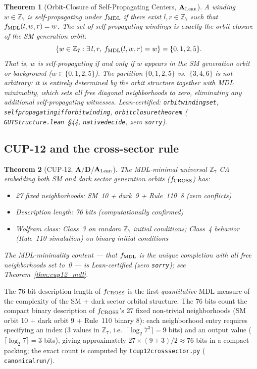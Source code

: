 \documentclass[11pt]{article}
\newtheorem{theorem}{Theorem}[section]
\theoremstyle{remark}
\newcommand{\lean}[1]{%
  \penalty-100
  \begingroup\def\_{\textunderscore\allowbreak}\texttt{#1}\endgroup}
\newcommand{\CatAL}{\ensuremath{\textbf{A}_{\rm Lean}}}
\newcommand{\CatAD}{\textbf{A/D}}
\begin{document}
\begin{theorem}[Orbit-Closure of Self-Propagating Centers, $\CatAL$]
\label{thm:orbit_closure}
A winding $w \in \mathbb{Z}_7$ is \emph{self-propagating} under $f_{\rm MDL}$ if there
exist $l, r \in \mathbb{Z}_7$ such that $f_{\rm MDL}(l, w, r) = w$. The set of
self-propagating windings is exactly the orbit-closure of the SM generation orbit:
\[
  \{w \in \mathbb{Z}_7 : \exists\, l, r,\; f_{\rm MDL}(l, w, r) = w\} = \{0, 1, 2, 5\}.
\]
That is, $w$ is self-propagating if and only if $w$ appears in the SM generation orbit
or background ($w \in \{0, 1, 2, 5\}$). The partition $\{0,1,2,5\}$
vs.\ $\{3,4,6\}$ is not arbitrary: it is entirely determined by the orbit structure
together with MDL minimality, which sets all free diagonal neighborhoods to zero,
eliminating any additional self-propagating witnesses.
Lean-certified: \lean{orbit\_winding\_set},
\lean{self\_propagating\_iff\_orbit\_winding},
\lean{orbit\_closure\_theorem}
(\lean{GUTStructure.lean}~\S44, \lean{native\_decide}, zero \texttt{sorry}).
\end{theorem}

\subsection{CUP-12 and the cross-sector rule}

\begin{theorem}[CUP-12, $\CatAD$/$\CatAL$]
\label{thm:cup12}
The MDL-minimal universal $\mathbb{Z}_7$ CA embedding both SM and dark sector generation
orbits ($f_{\rm CROSS}$) has:
\begin{itemize}
\item 27 fixed neighborhoods: SM~10 + dark~9 + Rule~110~8 (zero conflicts)
\item Description length: 76 bits (computationally confirmed)
\item Wolfram class: Class~3 on random $\mathbb{Z}_7$ initial conditions;
  Class~4 behavior (Rule~110 simulation) on binary initial conditions
\end{itemize}
The MDL-minimality content --- that $f_{\rm MDL}$ is the unique completion with all
free neighborhoods set to~0 --- is Lean-certified (zero \texttt{sorry}); see Theorem~\ref{thm:cup12_mdl}.
\end{theorem}

The 76-bit description length of $f_{\rm CROSS}$ is the first \emph{quantitative} MDL
measure of the complexity of the SM + dark sector orbital structure.
The 76 bits count the compact binary description of $f_{\rm CROSS}$'s 27 fixed
non-trivial neighborhoods (SM orbit 10 + dark orbit 9 + Rule~110 binary 8):
each neighborhood entry requires specifying an index (3 values in $\mathbb{Z}_7$,
i.e.\ $\lceil\log_2 7^3\rceil = 9$ bits) and an output value ($\lceil\log_2 7\rceil = 3$ bits),
giving approximately $27 \times (9+3)/2 \approx 76$ bits in a compact packing;
the exact count is computed by \lean{t\_cup12\_cross\_sector.py} (\lean{canonical\_run/}).
\end{document}
